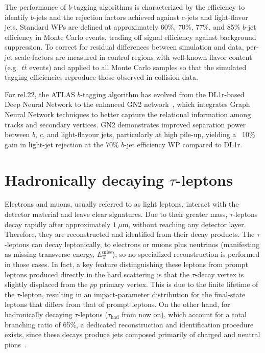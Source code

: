 The performance of $b$-tagging algorithms is characterized by the efficiency to identify $b$-jets and the rejection factors achieved against $c$-jets and light-flavor jets. Standard WPs are defined at approximately 60\%, 70\%, 77\%, and 85\% $b$-jet efficiency in \ttbar Monte Carlo events, trading off signal efficiency against background suppression.  To correct for residual differences between simulation and data, per-jet scale factors are measured in control regions with well-known flavor content (e.g.\ $t\bar t$ events) and applied to all Monte Carlo samples so that the simulated tagging efficiencies reproduce those observed in collision data.

For rel.22, the ATLAS $b$-tagging algorithm has evolved from the DL1r-based Deep Neural Network to the enhanced GN2 network~\cite{new_tagging}, which integrates Graph Neural Network techniques to better capture the relational information among tracks and secondary vertices. GN2 demonstrates improved separation power between \(b\), \(c\), and light-flavour jets, particularly at high pile-up, yielding a ~10\% gain in light-jet rejection at the 70\% \(b\)-jet efficiency WP compared to DL1r.  


\section{Hadronically decaying $\tau$-leptons}
\label{sec:tauhad}
Electrons and muons, usually referred to as light leptons, interact with the detector material and leave clear signatures. Due to their greater mass, \(\tau\)-leptons decay rapidly after approximately \(1\ \mu\mathrm{m}\), without reaching any detector layer. Therefore, they are reconstructed and identified from their decay products. The \(\tau\)-leptons can decay leptonically, to electrons or muons plus neutrinos (manifesting as missing transverse energy, \(E_{\mathrm{T}}^{\mathrm{miss}}\)), so no specialized reconstruction is performed in those cases. 
In fact, a key feature distinguishing these leptons from prompt leptons produced directly in the hard scattering is that the \(\tau\)-decay vertex is slightly displaced from the \(pp\) primary vertex. This is due to the finite lifetime of the \(\tau\)-lepton, resulting in an impact-parameter distribution for the final-state leptons that differs from that of prompt leptons. 
On the other hand, for hadronically decaying \(\tau\)-leptons (\(\tau_{\text{had}}\) from now on), which account for a total branching ratio of 65\%, a dedicated reconstruction and identification procedure exists, since these decays produce jets composed primarily of charged and neutral pions~\cite{PhysRevD.98.030001}.

